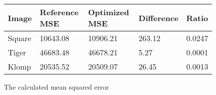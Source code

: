\begin{figure*}
    \centering
    \begin{tabular}{l | l l l l}
    Image   & Reference MSE & Optimized MSE & Difference    & Ratio     \\
    \hline
    Square  & 10643.08      & 10906.21      & 263.12        & 0.0247    \\
    Tiger   & 46683.48      & 46678.21      &   5.27        & 0.0001    \\
    Klomp   & 20535.52      & 20509.07      &  26.45        & 0.0013
    \end{tabular}
    \caption{The calculated mean squared error}
    \label{tab:mse}
\end{figure*}
